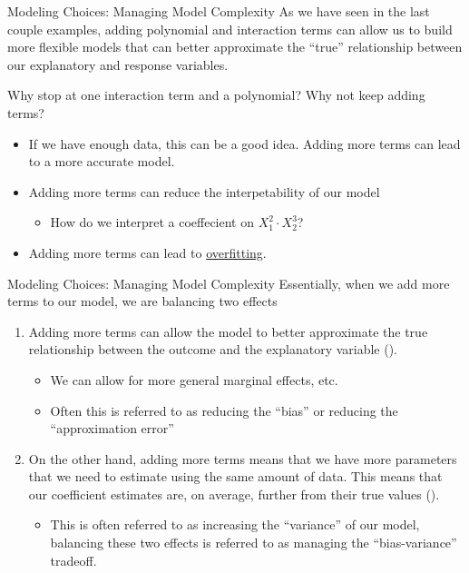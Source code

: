 \documentclass[notheorems,9pt]{beamer}
\begin{document}
\begin{frame}{Modeling Choices: Managing Model Complexity} 
	\label{frame:interaction4}
	As we have seen in the last couple examples, adding polynomial and interaction terms can allow us to build more flexible models that can better approximate the ``true'' relationship between our explanatory and response variables. 

	 Why stop at one interaction term and a polynomial? Why not keep adding terms?
	\begin{itemize}
		\item<2-> If we have enough data, this can be a good idea. Adding more terms can lead to a more accurate model. 
		\item<3-> Adding more terms can reduce the interpetability of our model
		\begin{itemize}
			\item How do we interpret a coeffecient on \(X_1^2\cdot X_2^3\)?
		\end{itemize}
		\item<4-> Adding more terms can lead to \underline{overfitting}.
	\end{itemize}
\end{frame}
\begin{frame}{Modeling Choices: Managing Model Complexity} 
	\label{frame:overfitting1}
	Essentially, when we add more terms to our model, we are balancing two effects
	\begin{enumerate}
		\item Adding more terms can allow the model to better approximate the true relationship between the outcome and the explanatory variable ().
		\begin{itemize}
			\item We can allow for more general marginal effects, etc.
			\item Often this is referred to as reducing the ``bias'' or reducing the ``approximation error''
		\end{itemize}
		\item On the other hand, adding more terms means that we have more parameters that we need to estimate using the same amount of data. This means that our coefficient estimates are, on average, further from their true values ().
		\begin{itemize}
			\item This is often referred to as increasing the ``variance'' of our model, balancing these two effects is referred to as managing the ``bias-variance'' tradeoff.
		\end{itemize}
	\end{enumerate}
\end{frame}
\end{document}

